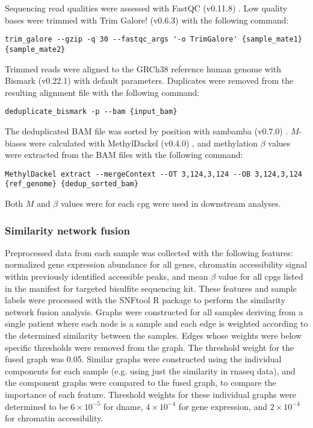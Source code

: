 Sequencing read qualities were assessed with FastQC (v0.11.8) \cite{simonandrewsFastQCQualityControl2010}.
Low quality bases were trimmed with Trim Galore! (v0.6.3) \cite{felixkruegerTrimGalore2012} with the following command:

\begin{lstlisting}[basicstyle=\ttfamily]
  trim_galore --gzip -q 30 --fastqc_args '-o TrimGalore' {sample_mate1} {sample_mate2}
\end{lstlisting}

Trimmed reads were aligned to the GRCh38 reference human genome with Bismark (v0.22.1) \cite{kruegerDNAMethylomeAnalysis2012} with default parameters.
Duplicates were removed from the resulting alignment file with the following command:

\begin{lstlisting}[basicstyle=\ttfamily]
  deduplicate_bismark -p --bam {input_bam}
\end{lstlisting}

The deduplicated BAM file was sorted by position with sambamba (v0.7.0) \cite{tarasovSambambaFastProcessing2015}.
$M$-biases were calculated with MethylDackel (v0.4.0) \cite{ryanMethylDackel2019}, and methylation $\beta$ values were extracted from the BAM files with the following command:

\begin{lstlisting}[basicstyle=\ttfamily]
  MethylDackel extract --mergeContext --OT 3,124,3,124 --OB 3,124,3,124 {ref_genome} {dedup_sorted_bam}
\end{lstlisting}

Both $M$ and $\beta$ values were for each \gls{cpg} were used in downstream analyses.

\subsubsection{Similarity network fusion}

Preprocessed data from each sample was collected with the following features: normalized gene expression abundance for all genes, chromatin accessibility signal within previously identified accessible peaks, and mean $\beta$ value for all \glspl{cpg} listed in the manifest for targeted bisulfite sequencing kit.
These features and sample labels were processed with the SNFtool R package \cite{wangSimilarityNetworkFusion2014} to perform the similarity network fusion analysis.
Graphs were constructed for all samples deriving from a single patient where each node is a sample and each edge is weighted according to the determined similarity between the samples.
Edges whose weights were below specific thresholds were removed from the graph.
The threshold weight for the fused graph was 0.05.
Similar graphs were constructed using the individual components for each sample (e.g. using just the similarity in \gls{rnaseq} data), and the component graphs were compared to the fused graph, to compare the importance of each feature.
Threshold weights for these individual graphs were determined to be $6 \times 10^{-5}$ for \gls{dname}, $4 \times 10^{-4}$ for gene expression, and $2 \times 10^{-4}$ for chromatin accessibility.

